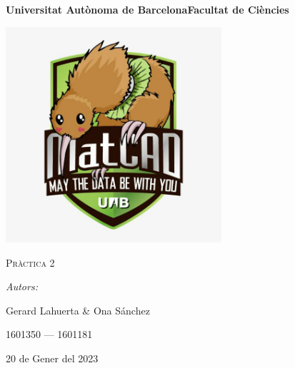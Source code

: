 \documentclass[a4paper, 11pt]{article}
\begin{document}
\begin{titlepage}
    \centering
    {\bfseries\LARGE \hspace{1.9em} Universitat Autònoma de Barcelona\newline Facultat de Ciències\par}
    \vspace{2cm}
    {\hspace{-1em}\includegraphics[width=0.6\textwidth]{MatCAD3.jpg}\par}
    \vspace{1cm}
    {\scshape\Huge Pràctica 2\par} 
    \vspace{1cm}
    {\Large \itshape Autors: \par}
    \vspace{0.5cm}
    {\Large \hspace{-1.5 em}Gerard Lahuerta \& Ona Sánchez \par}
    \vspace{0.5cm}
    {\Large 1601350 --- 1601181 \par}
    \vspace{1cm}
    {\Large 20 de Gener del 2023\par}
\end{titlepage}

\justifying

\newpage
{
\small
\setcounter{page}{2}
\pagestyle{plain}
\tableofcontents
\cleardoublepage
{}
}
\newpage
\end{document}
